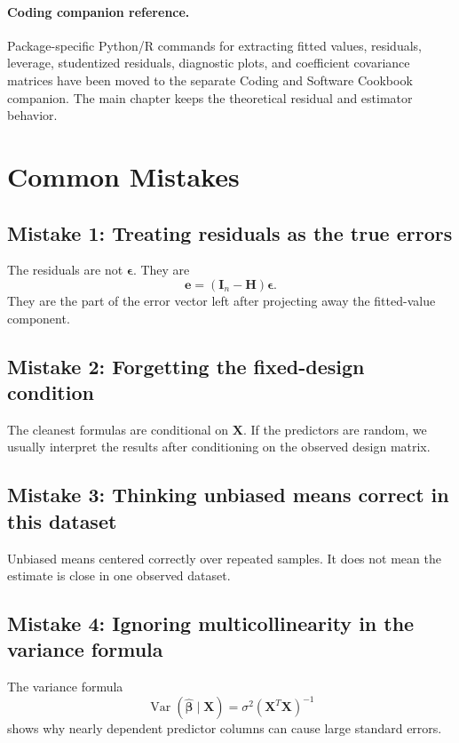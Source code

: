\paragraph{Coding companion reference.}
Package-specific Python/R commands for extracting fitted values, residuals, leverage, studentized residuals, diagnostic plots, and coefficient covariance matrices have been moved to the separate Coding and Software Cookbook companion.  The main chapter keeps the theoretical residual and estimator behavior.

\section{Common Mistakes}

\subsection*{Mistake 1: Treating residuals as the true errors}

The residuals are not \(\boldsymbol{\epsilon}\).  They are
\begin{equation}
  \mathbf{e}=(\mathbf{I}_n-\mathbf{H})\boldsymbol{\epsilon}.
\end{equation}
They are the part of the error vector left after projecting away the fitted-value component.

\subsection*{Mistake 2: Forgetting the fixed-design condition}

The cleanest formulas are conditional on \(\mathbf{X}\).  If the predictors are random, we usually interpret the results after conditioning on the observed design matrix.

\subsection*{Mistake 3: Thinking unbiased means correct in this dataset}

Unbiased means centered correctly over repeated samples.  It does not mean the estimate is close in one observed dataset.

\subsection*{Mistake 4: Ignoring multicollinearity in the variance formula}

The variance formula
\begin{equation}
  \operatorname{Var}(\widehat{\boldsymbol{\beta}}\mid\mathbf{X})
  =\sigma^2(\mathbf{X}^T\mathbf{X})^{-1}
\end{equation}
shows why nearly dependent predictor columns can cause large standard errors.

